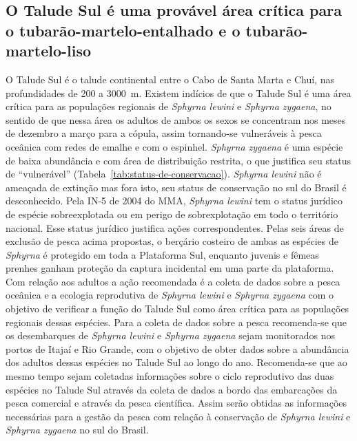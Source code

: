 \documentclass[a4paper,11pt,twoside,showtrims,onecolumn,openright,final]{memoir}
\begin{document}

\subsection*{O Talude Sul é uma provável área crítica para o 
          tubarão-martelo-entalhado e o tubarão-martelo-liso}

O Talude Sul é o talude continental  entre o Cabo de Santa Marta e Chuí, nas profundidades 
de 200 a 3000~m. Existem indícios de que o Talude Sul é uma área crítica para as 
populações regionais de \emph{Sphyrna lewini} e \emph{Sphyrna zygaena}, no sentido de que nessa área os 
adultos de ambos os sexos se concentram nos meses de dezembro a março para a cópula, assim 
tornando-se vulneráveis à pesca  oceânica com redes de emalhe e com o espinhel. \emph{Sphyrna zygaena} 
é uma espécie de baixa abundância e com área de distribuição restrita, o que justifica seu status 
de ``vulnerável'' (Tabela~\ref{tab:status-de-conservacao}). \emph{Sphyrna lewini} não é ameaçada de extinção 
mas fora isto, seu status de conservação no sul do Brasil é desconhecido. 
Pela IN-5 de 2004 do MMA, \emph{Sphyrna lewini} tem o status jurídico de espécie sobreexplotada ou 
em perigo de sobrexplotação em todo o território nacional. 
Esse status jurídico justifica ações correspondentes. Pelas seis  áreas de exclusão de pesca acima 
propostas, o berçário costeiro de ambas as espécies de \emph{Sphyrna} é protegido em toda a Plataforma Sul, 
enquanto juvenis e fêmeas prenhes ganham proteção da captura incidental em uma parte da plataforma. 
Com relação aos adultos a ação recomendada é a coleta de dados sobre a pesca oceânica e a ecologia 
reprodutiva de \emph{Sphyrna lewini} e \emph{Sphyrna zygaena} com o objetivo de verificar a função do Talude Sul 
como área crítica para as populações regionais dessas espécies. Para a coleta de dados sobre a pesca 
recomenda-se que os desembarques de \emph{Sphyrna lewini} e \emph{Sphyrna zygaena} sejam 
monitorados nos portos de Itajaí e Rio Grande, com o objetivo de obter dados sobre a abundância dos 
adultos dessas espécies no Talude Sul ao longo do ano. Recomenda-se que ao mesmo tempo sejam coletadas 
informações sobre o ciclo reprodutivo das duas espécies no Talude Sul através da coleta de dados a 
bordo das embarcações da pesca comercial e através da pesca científica. Assim serão obtidas as 
informações necessárias para a gestão da pesca com relação à conservação de \emph{Sphyrna lewini} 
e \emph{Sphyrna zygaena} no sul do Brasil. 
\end{document}
